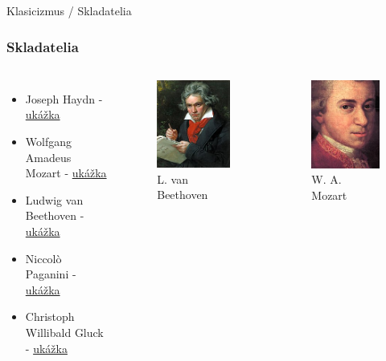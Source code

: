 \documentclass[dvipsnames]{beamer}
\begin{document}
\begin{frame}{\small \textcolor{g}{Klasicizmus} / \Large Skladatelia}
	\subsubsection{Skladatelia}
	\begin{columns}

		\begin{itemize}
			\item Joseph Haydn - \href{https://www.gtsforum.xyz/haydn.mp3}{ukážka}
			\item Wolfgang Amadeus Mozart - \href{https://www.gtsforum.xyz/mozart.mp3}{ukážka}
			\item Ludwig van Beethoven - \href{https://www.gtsforum.xyz/beethoven.mp3}{ukážka}
			\item Niccolò Paganini - \href{https://www.gtsforum.xyz/paganini.ogg}{ukážka}
			\item Christoph  Willibald Gluck - \href{https://www.gtsforum.xyz/gluck.ogg}{ukážka}
		\end{itemize}
		\begin{figure}
			\includegraphics[scale=0.45]{beethoven}
			\caption{L. van Beethoven}
		\end{figure}
		\begin{figure}
			\includegraphics[scale=0.45]{mozart}
			\caption{W. A. Mozart}
		\end{figure}

	\end{columns}
\end{frame}
\end{document}
